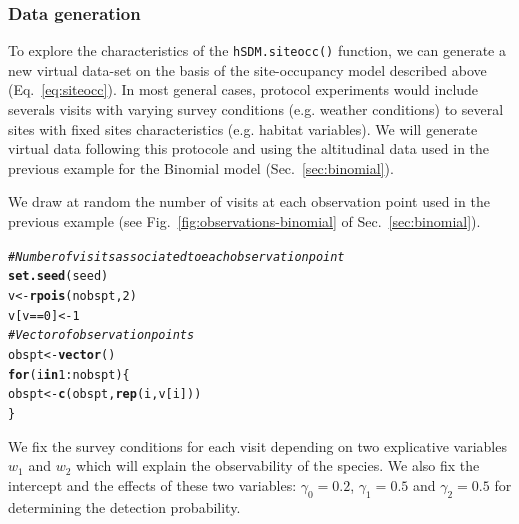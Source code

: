 \documentclass[a4paper, 12pt, leqno]{article}\usepackage[]{graphicx}\usepackage[]{color}
\makeatletter
\newcommand{\hlnum}[1]{\textcolor[rgb]{0.686,0.059,0.569}{#1}}%
\newcommand{\hlcom}[1]{\textcolor[rgb]{0.678,0.584,0.686}{\textit{#1}}}%
\newcommand{\hlopt}[1]{\textcolor[rgb]{0,0,0}{#1}}%
\newcommand{\hlstd}[1]{\textcolor[rgb]{0.345,0.345,0.345}{#1}}%
\newcommand{\hlkwa}[1]{\textcolor[rgb]{0.161,0.373,0.58}{\textbf{#1}}}%
\newcommand{\hlkwb}[1]{\textcolor[rgb]{0.69,0.353,0.396}{#1}}%
\newcommand{\hlkwd}[1]{\textcolor[rgb]{0.737,0.353,0.396}{\textbf{#1}}}%
\newenvironment{kframe}{%
 \def\at@end@of@kframe{}%
 \ifinner\ifhmode%
  \def\at@end@of@kframe{\end{minipage}}%
  \begin{minipage}{\columnwidth}%
 \fi\fi%
 \def\FrameCommand##1{\hskip\@totalleftmargin \hskip-\fboxsep
 \colorbox{shadecolor}{##1}\hskip-\fboxsep
     \hskip-\linewidth \hskip-\@totalleftmargin \hskip\columnwidth}%
 \MakeFramed {\advance\hsize-\width
   \@totalleftmargin\z@ \linewidth\hsize
   \@setminipage}}%
 {\par\unskip\endMakeFramed%
 \at@end@of@kframe}
\newenvironment{knitrout}{}{} %
\makeatother
\begin{document}
\subsubsection{Data generation}

To explore the characteristics of the \texttt{hSDM.siteocc()} function, we can generate a
new virtual data-set on the basis of the site-occupancy model described above
(Eq.~\ref{eq:siteocc}). In most general cases, protocol experiments would include severals
visits with varying survey conditions (e.g. weather conditions) to several sites with
fixed sites characteristics (e.g. habitat variables). We will generate virtual data
following this protocole and using the altitudinal data used in the previous example for
the Binomial model (Sec.~\ref{sec:binomial}).

We draw at random the number of visits at each observation point used in the previous
example (see Fig.~\ref{fig:observations-binomial} of Sec.~\ref{sec:binomial}).

\begin{knitrout}\small
{}\color{fgcolor}\begin{kframe}
\begin{alltt}
\hlcom{# Number of visits associated to each observation point}
\hlkwd{set.seed}\hlstd{(seed)}
\hlstd{v} \hlkwb{<-} \hlkwd{rpois}\hlstd{(nobspt,}\hlnum{2}\hlstd{)}
\hlstd{v[v}\hlopt{==}\hlnum{0}\hlstd{]} \hlkwb{<-} \hlnum{1}
\hlcom{# Vector of observation points}
\hlstd{obspt} \hlkwb{<-} \hlkwd{vector}\hlstd{()}
\hlkwa{for} \hlstd{(i} \hlkwa{in} \hlnum{1}\hlopt{:}\hlstd{nobspt) \{}
    \hlstd{obspt} \hlkwb{<-} \hlkwd{c}\hlstd{(obspt,}\hlkwd{rep}\hlstd{(i,v[i]))}
\hlstd{\}}
\end{alltt}
\end{kframe}
\end{knitrout}


We fix the survey conditions for each visit depending on two explicative variables $w_1$
and $w_2$ which will explain the observability of the species. We also fix the intercept
and the effects of these two variables: $\gamma_0=0.2$, $\gamma_1=0.5$ and $\gamma_2=0.5$
for determining the detection probability.
\end{document}

